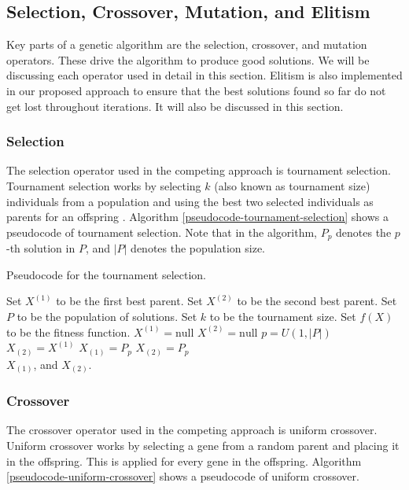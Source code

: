 \subsection{Selection, Crossover, Mutation, and Elitism}
Key parts of a genetic algorithm are the selection, crossover, and mutation operators. These drive the algorithm to produce good solutions. We will be discussing each operator used in detail in this section. Elitism is also implemented in our proposed approach to ensure that the best solutions found so far do not get lost throughout iterations. It will also be discussed in this section.

\subsubsection{Selection}
The selection operator used in the competing approach is tournament selection. Tournament selection works by selecting $k$ (also known as tournament size) individuals from a population and using the best two selected individuals as parents for an offspring \cite{StackOverflow-TournamentSelection}. Algorithm \ref{pseudocode-tournament-selection} shows a pseudocode of tournament selection. Note that in the algorithm, $P_{p}$ denotes the $p$-th solution in $P$, and $|P|$ denotes the population size.

\begin{algorithm}
\caption{Pseudocode for the tournament selection.}
\label{pseudocode-tournament-selection}
\begin{algorithmic}[1]
\State Set $X^{(1)}$ to be the first best parent.
\State Set $X^{(2)}$ to be the second best parent.
\State Set $P$ to be the population of solutions.
\State Set $k$ to be the tournament size.
\State Set $f(X)$ to be the fitness function.
\State $X^{(1)} = \text{null}$
\State $X^{(2)} = \text{null}$
	\State $p = U(1, |P|)$
		\State $X_{(2)} = X^{(1)}$
		\State $X_{(1)} = P_{p}$
		\State $X_{(2)} = P_{p}$
	\EndIf
\EndFor \\
\Return $X_{(1)}$, and $X_{(2)}$.
\end{algorithmic}
\end{algorithm}

\subsubsection{Crossover}
The crossover operator used in the competing approach is uniform crossover. Uniform crossover works by selecting a gene from a random parent and placing it in the offspring. This is applied for every gene in the offspring. Algorithm \ref{pseudocode-uniform-crossover} shows a pseudocode of uniform crossover.

